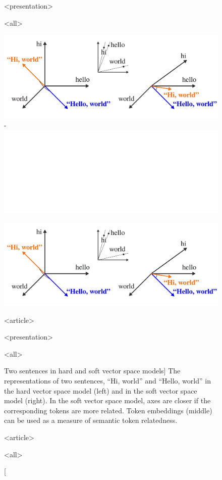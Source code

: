 \begin{figure}

\mode
<presentation>

\vspace*{-0.9cm}

\mode
<all>

\centering

\ifobscured

\includegraphics{soft-vsm}%
\kern-\columnwidth
\includegraphics{soft-vsm-obscured}

\else

\includegraphics{soft-vsm}

\fi

\mode
<article>

\vspace{-0.4cm}

\mode
<presentation>

\vspace{-0.6cm}

\mode
<all>

\caption
  [Two sentences in hard and soft vector space models]%
  {The representations of two sentences, ``Hi, world'' and ``Hello,
   world'' in the hard vector space model (left) and in the soft vector space
   model (right). In the soft vector space model, axes are closer if the
   corresponding tokens are more related. Token embeddings (middle) can be used
   as a measure of semantic token relatedness.
   \cite[Figure 6]{novotny2020three}}

\mode
<article>

\label{fig:soft-vsm}

\mode
<all>

\end{figure}
